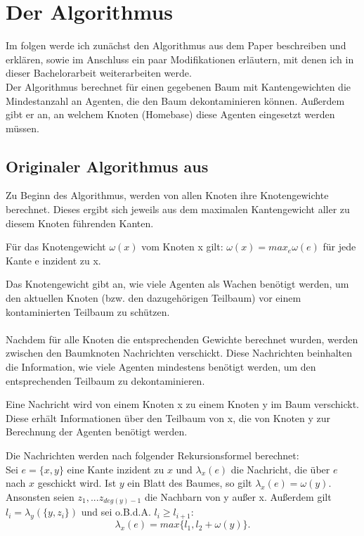 \section{Der Algorithmus}\label{kap_algorithmus}
Im folgen werde ich zunächst den Algorithmus aus dem Paper \cite{cima_paper} beschreiben und erklären, sowie im Anschluss ein paar Modifikationen erläutern, mit denen ich in dieser Bachelorarbeit weiterarbeiten werde.\\
Der Algorithmus berechnet für einen gegebenen Baum mit Kantengewichten die Mindestanzahl an Agenten, die den Baum dekontaminieren können. Außerdem gibt er an, an welchem Knoten (Homebase) diese Agenten eingesetzt werden müssen.



\subsection{Originaler Algorithmus aus \cite{cima_paper}}\label{paperAlgoChapter}

Zu Beginn des Algorithmus, werden von allen Knoten ihre Knotengewichte berechnet. Dieses ergibt sich jeweils aus dem maximalen Kantengewicht aller zu diesem Knoten führenden Kanten. 

\begin{mydef}
	Für das Knotengewicht $\omega(x)$ vom Knoten x gilt: $\omega(x) = max_{e} \omega(e)$ für jede Kante e inzident zu x.
\end{mydef}

Das Knotengewicht gibt an, wie viele Agenten als Wachen benötigt werden, um den aktuellen Knoten (bzw. den dazugehörigen Teilbaum) vor einem kontaminierten Teilbaum zu schützen.
\\
\\
Nachdem für alle Knoten die entsprechenden Gewichte berechnet wurden, werden zwischen den Baumknoten Nachrichten verschickt. Diese Nachrichten beinhalten die Information, wie viele Agenten mindestens benötigt werden, um den entsprechenden Teilbaum zu dekontaminieren.  

\begin{mydef}\label{def_nachricht}
	Eine Nachricht wird von einem Knoten x zu einem Knoten y im Baum verschickt. Diese erhält Informationen über den Teilbaum von x, die von Knoten y zur Berechnung der Agenten benötigt werden.
\end{mydef}

Die Nachrichten werden nach folgender Rekursionsformel \cite{cima_paper} berechnet:\\
Sei $e = \{x, y\}$ eine Kante inzident zu $x$ und $\lambda_{x}(e)$ die Nachricht, die über $e$ nach $x$ geschickt wird. Ist $y$ ein Blatt des Baumes, so gilt $\lambda_{x}(e) = \omega(y)$. Ansonsten seien $z_{1}, ... z_{deg(y)-1}$ die Nachbarn von y außer x. Außerdem gilt $l_{i} = \lambda_{y}(\{y, z_{i}\})$ und sei o.B.d.A. $l_{i} \geq l_{i+1}$: $$\lambda_{x}(e) = max \{l_{1}, l_{2} + \omega(y)\}.$$



